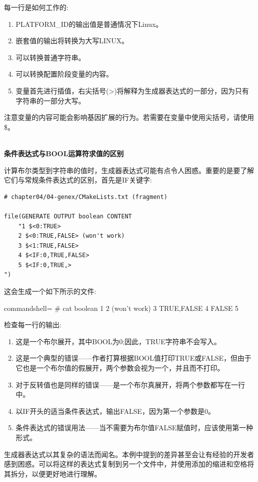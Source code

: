 每一行是如何工作的:

\begin{enumerate}
\item 
PLATFORM\_ID的输出值是普通情况下Linux。

\item 
嵌套值的输出将转换为大写LINUX。

\item 
可以转换普通字符串。

\item 
可以转换配置阶段变量的内容。

\item 
变量首先进行插值，右尖括号(>)将解释为生成器表达式的一部分，因为只有字符串的一部分大写。
\end{enumerate}

注意变量的内容可能会影响基因扩展的行为。若需要在变量中使用尖括号，请使用\$<ANGLE-R>。

\hspace*{\fill} \\ %
\noindent
\textbf{条件表达式与BOOL运算符求值的区别}

计算布尔类型到字符串的值时，生成器表达式可能有点令人困惑。重要的是要了解它们与常规条件表达式的区别，首先是IF关键字:

\begin{lstlisting}[style=styleCMake]
# chapter04/04-genex/CMakeLists.txt (fragment)

file(GENERATE OUTPUT boolean CONTENT
	"1 $<0:TRUE>
	2 $<0:TRUE,FALSE> (won't work)
	3 $<1:TRUE,FALSE>
	4 $<IF:0,TRUE,FALSE>
	5 $<IF:0,TRUE,>
")
\end{lstlisting}

这会生成一个如下所示的文件:

\begin{tcblisting}{commandshell={}}
# cat boolean
1
  2 (won't work)
  3 TRUE,FALSE 
  4 FALSE
  5
\end{tcblisting}

检查每一行的输出:

\begin{enumerate}
\item 
这是一个布尔展开，其中BOOL为0;因此，TRUE字符串不会写入。

\item 
这是一个典型的错误——作者打算根据BOOL值打印TRUE或FALSE，但由于它也是一个布尔值的假展开，两个参数会视为一个，并且而不打印。

\item 
对于反转值也是同样的错误——是一个布尔真展开，将两个参数都写在一行中。

\item 
以IF开头的适当条件表达式，输出FALSE，因为第一个参数是0。

\item 
条件表达式的错误用法——当不需要为布尔值FALSE赋值时，应该使用第一种形式。
\end{enumerate}

生成器表达式以其复杂的语法而闻名。本例中提到的差异甚至会让有经验的开发者感到困惑。可以将这样的表达式复制到另一个文件中，并使用添加的缩进和空格将其拆分，以便更好地进行理解。











